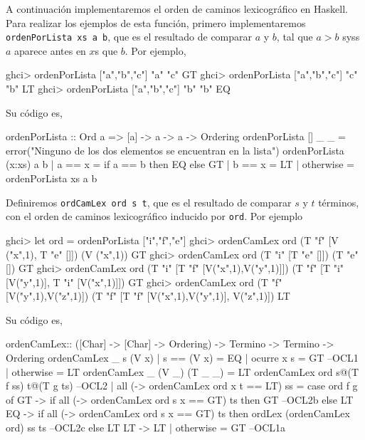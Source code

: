 
A continuación implementaremos el orden de caminos lexicográfico en
Haskell. Para realizar los ejemplos de esta función, primero
implementaremos \texttt{ordenPorLista xs a b}, que es el resultado de
comparar $a$ y $b$, tal que $a > b$ syss $a$ aparece antes en $x$s que
$b$. Por ejemplo,

\begin{sesion}
ghci> ordenPorLista ["a","b","c"] "a" "c"
GT
ghci> ordenPorLista ["a","b","c"] "c" "b"
LT
ghci> ordenPorLista ["a","b","c"] "b" "b"
EQ
\end{sesion}

Su código es,

\begin{codigo}
ordenPorLista :: Ord a => [a] -> a  -> a -> Ordering
ordenPorLista [] _ _ =
  error("Ninguno de los dos elementos se encuentran
         en la lista")
ordenPorLista (x:xs) a b
  | a == x = if a == b
             then EQ
             else GT
  | b == x = LT
  | otherwise = ordenPorLista xs a b
\end{codigo}

Definiremos \texttt{ordCamLex ord s t}, que es el resultado de
comparar $s$ y $t$ términos, con el orden de caminos lexicográfico
inducido por \texttt{ord}. Por ejemplo

\begin{sesion}
ghci> let ord = ordenPorLista ["i","f","e"]
ghci> ordenCamLex ord (T "f" [V ("x",1), T "e" []]) (V ("x",1))
GT
ghci> ordenCamLex ord (T "i" [T "e" []]) (T "e" [])
GT
ghci> ordenCamLex ord (T "i" [T "f" [V("x",1),V("y",1)]])
                      (T "f" [T "i" [V("y",1)], T "i" [V("x",1)]])
GT
ghci> ordenCamLex ord (T "f" [V("y",1),V("z",1)])
                      (T "f" [T "f" [V("x",1),V("y",1)], V("z",1)])
LT
\end{sesion}

Su código es,

\begin{codigo}
 ordenCamLex:: ([Char] -> [Char] -> Ordering)
                -> Termino -> Termino -> Ordering
ordenCamLex _ s (V x)
  | s == (V x) = EQ
  | ocurre x s = GT --OCL1
  | otherwise = LT
ordenCamLex _ (V _) (T _ _) = LT
ordenCamLex ord s@(T f ss) t@(T g ts) --OCL2
  | all (\x -> ordenCamLex ord x t == LT) ss
    = case ord f g of
      GT -> if all (\x -> ordenCamLex ord s x == GT) ts
            then GT --OCL2b
            else LT
      EQ -> if all (\x -> ordenCamLex ord s x == GT) ts
            then ordLex (ordenCamLex ord) ss ts --OCL2c
            else LT
      LT -> LT  
  | otherwise = GT --OCL1a
\end{codigo}

